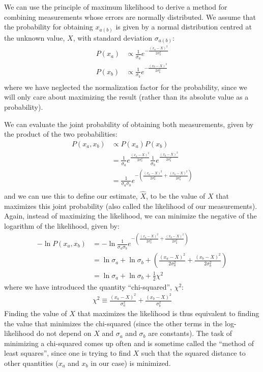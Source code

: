 We can use the principle of maximum likelihood to derive a method for combining measurements whose errors are normally distributed. We assume that the probability for obtaining $x_{a(b)}$ is given by a normal distribution centred at the unknown value, $X$, with standard deviation $\sigma_{a(b)}$:
\begin{align}
P(x_a)&\propto \frac{1}{\sigma_a}e^{-\frac{(x_a-X)^2}{2\sigma_a^2}}\nonumber\\
P(x_b)&\propto \frac{1}{\sigma_b}e^{-\frac{(x_b-X)^2}{2\sigma_b^2}}\nonumber\\
\end{align} 
where we have neglected the normalization factor for the probability, since we will only care about maximizing the result (rather than its absolute value as a probability). 

We can evaluate the joint probability of obtaining both measurements, given by the product of the two probabilities:
\begin{align}
P(x_a,x_b)&\propto P(x_a) P(x_b) \nonumber\\
&=\frac{1}{\sigma_a}e^{\frac{(x_a-X)^2}{2\sigma_a^2}}\frac{1}{\sigma_b}e^{\frac{(x_b-X)^2}{2\sigma_b^2}}\nonumber\\
&=\frac{1}{\sigma_a\sigma_b}e^{-\left(\frac{(x_a-X)^2}{2\sigma_a^2}+\frac{(x_b-X)^2}{2\sigma_b^2}\right)}\nonumber\\
\end{align}
and we can use this to define our estimate, $\hat X$, to be the value of $X$ that maximizes this joint probability (also called the likelihood of our measurements). Again, instead of maximizing the likelihood, we can minimize the negative of the logarithm of the likelihood, given by:
\begin{align}
-\ln{P(x_a,x_b)}&=-\ln{\frac{1}{\sigma_a\sigma_b}e^{-\left(\frac{(x_a-X)^2}{2\sigma_a^2}+\frac{(x_b-X)^2}{2\sigma_b^2}\right)}}\nonumber\\
&=\ln{\sigma_a}+\ln{\sigma_b}+\left(\frac{(x_a-X)^2}{2\sigma_a^2}+\frac{(x_b-X)^2}{2\sigma_b^2}\right)\nonumber\\
&=\ln{\sigma_a}+\ln{\sigma_b}+\frac{1}{2}\chi^2
\end{align} 
where we have introduced the quantity ``chi-squared'', $\chi^2$:
\begin{align}
\chi^2\equiv \frac{(x_a-X)^2}{\sigma_a^2}+\frac{(x_b-X)^2}{\sigma_b^2}
\end{align}
Finding the value of $X$ that maximizes the likelihood is thus equivalent to finding the value that minimizes the chi-squared (since the other terms in the log-likelihood do not depend on $X$ and $\sigma_a$ and $\sigma_b$ are constants). The task of minimizing a chi-squared comes up often and is sometime called the ``method of least squares'', since one is trying to find $X$ such that the squared distance to other quantities ($x_a$ and $x_b$ in our case) is minimized. 

